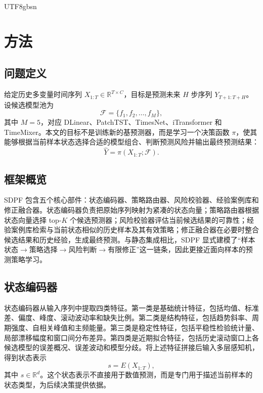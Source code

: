 \documentclass[journal,twoside,web]{ieeecolor}
\begin{document}
\begin{CJK*}{UTF8}{gbsn}
\section{方法}
\subsection{问题定义}
给定历史多变量时间序列 $X_{1:T}\in\mathbb{R}^{T\times C}$，目标是预测未来 $H$ 步序列 $Y_{T+1:T+H}$。设候选模型池为
\begin{equation}
\mathcal{F}=\{f_1,f_2,\ldots,f_M\},
\label{eq:model_pool}
\end{equation}
其中 $M=5$，对应 DLinear、PatchTST、TimesNet、iTransformer 和 TimeMixer。本文的目标不是训练新的基预测器，而是学习一个决策函数 $\pi$，使其能够根据当前样本状态选择合适的模型组合、判断预测风险并输出最终预测结果：
\begin{equation}
\hat{Y}=\pi(X_{1:T};\mathcal{F}).
\label{eq:overall}
\end{equation}

\subsection{框架概览}
SDPF 包含五个核心部件：状态编码器、策略路由器、风险校验器、经验案例库和修正融合器。状态编码器负责把原始序列映射为紧凑的状态向量；策略路由器根据状态向量选择 top-$K$ 个候选预测器；风险校验器评估当前候选结果的可靠性；经验案例库检索与当前状态相似的历史样本及其有效策略；修正融合器在必要时整合候选结果和历史经验，生成最终预测。与静态集成相比，SDPF 显式建模了“样本状态$\rightarrow$策略选择$\rightarrow$风险判断$\rightarrow$有限修正”这一链条，因此更接近面向样本的预测策略学习。

\subsection{状态编码器}
状态编码器从输入序列中提取四类特征。第一类是基础统计特征，包括均值、标准差、偏度、峰度、滚动波动率和缺失比例。第二类是结构特征，包括趋势斜率、周期强度、自相关峰值和主频能量。第三类是稳定性特征，包括平稳性检验统计量、局部漂移幅度和窗口间分布差异。第四类是近期拟合特征，包括历史滚动窗口上各候选模型的误差概况、误差波动和模型分歧。将上述特征拼接后输入多层感知机，得到状态表示
\begin{equation}
s = E(X_{1:T}),
\label{eq:state}
\end{equation}
其中 $s\in\mathbb{R}^{d}$。这个状态表示不直接用于数值预测，而是专门用于描述当前样本的状态类型，为后续决策提供依据。


\end{CJK*}
\end{document}
